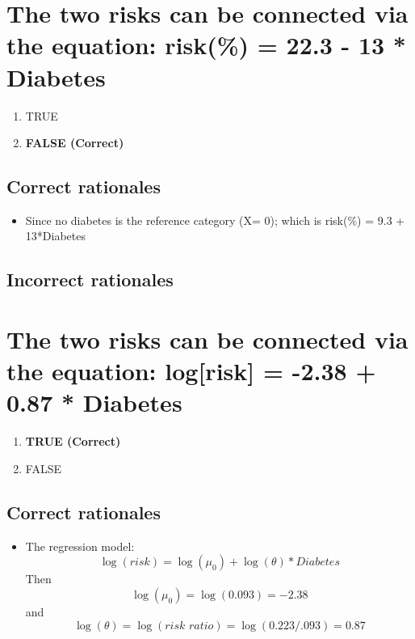 \documentclass[letterpaper,9pt,twoside,printwatermark=false]{pinp}
\providecommand{\tightlist}{%
  \setlength{\itemsep}{0pt}\setlength{\parskip}{0pt}}
\begin{document}
\section{The two risks can be connected via the equation: risk(\%) =
22.3 - 13 *
Diabetes}\label{the-two-risks-can-be-connected-via-the-equation-risk-22.3---13-diabetes}

\begin{enumerate}
\def\labelenumi{\alph{enumi}.}
\tightlist
\item
  TRUE
\item
  \textbf{FALSE (Correct)}
\end{enumerate}

\subsection{Correct rationales}\label{correct-rationales-3}

\begin{itemize}
\tightlist
\item
  Since no diabetes is the reference category (X= 0); which is risk(\%)
  = 9.3 + 13*Diabetes
\end{itemize}

\subsection{Incorrect rationales}\label{incorrect-rationales-3}

\section{The two risks can be connected via the equation: log{[}risk{]}
= -2.38 + 0.87 *
Diabetes}\label{the-two-risks-can-be-connected-via-the-equation-logrisk--2.38-0.87-diabetes}

\begin{enumerate}
\def\labelenumi{\alph{enumi}.}
\tightlist
\item
  \textbf{TRUE (Correct)}
\item
  FALSE
\end{enumerate}

\subsection{Correct rationales}\label{correct-rationales-4}

\begin{itemize}
\tightlist
\item
  The regression model:
  \[\log(risk) = \log(\mu_0) + \log(\theta)*Diabetes\] Then
  \[\log(\mu_0) = \log(0.093) = -2.38\] and
  \[\log(\theta) =\log(risk\,\,ratio) = \log(0.223/.093) = 0.87\]
\end{itemize}
\end{document}
